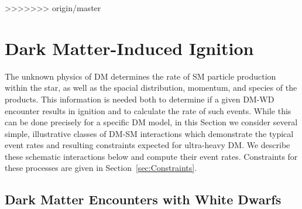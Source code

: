 \documentclass[twocolumn, preprintnumbers,amsmath,amssymb,prd, superscriptaddress]{revtex4}
\newcommand{\GeV}{\text{GeV}}
\newcommand{\cm}{\text{cm}}
\begin{document}

>>>>>>> origin/master

\section{Dark Matter-Induced Ignition}
\label{sec:DMexplode}

The unknown physics of DM determines the rate of SM particle production within the star, as well as the spacial distribution, momentum, and species of the products.
This information is needed both to determine if a given DM-WD encounter results in ignition and to calculate the rate of such events.
While this can be done precisely for a specific DM model, in this Section we consider several simple, illustrative classes of DM-SM interactions which demonstrate the typical event rates and resulting constraints expected for ultra-heavy DM.
We describe these schematic interactions below and compute their event rates.
Constraints for these processes are given in Section~\ref{sec:Constraints}.

\subsection{Dark Matter Encounters with White Dwarfs}
\end{document}
